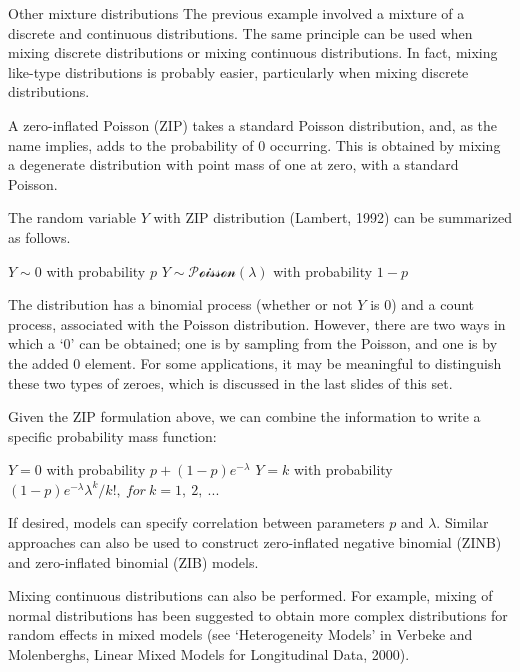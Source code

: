 \documentclass[
  9pt,
  ignorenonframetext,
]{beamer}
\begin{document}
\begin{frame}{Other mixture distributions}
\protect\hypertarget{other-mixture-distributions}{}
The previous example involved a mixture of a discrete and continuous
distributions. The same principle can be used when mixing discrete
distributions or mixing continuous distributions. In fact, mixing
like-type distributions is probably easier, particularly when mixing
discrete distributions.

A zero-inflated Poisson (ZIP) takes a standard Poisson distribution,
and, as the name implies, adds to the probability of 0 occurring. This
is obtained by mixing a degenerate distribution with point mass of one
at zero, with a standard Poisson.

The random variable \(Y\) with ZIP distribution (Lambert, 1992) can be
summarized as follows.

\(Y \sim 0\) with probability \(p\)
\(Y \sim \mathcal {Poisson}(\lambda)\) with probability \(1-p\)
\end{frame}

\begin{frame}{}
\protect\hypertarget{section-13}{}
The distribution has a binomial process (whether or not \(Y\) is 0) and
a count process, associated with the Poisson distribution. However,
there are two ways in which a `0' can be obtained; one is by sampling
from the Poisson, and one is by the added 0 element. For some
applications, it may be meaningful to distinguish these two types of
zeroes, which is discussed in the last slides of this set.

Given the ZIP formulation above, we can combine the information to write
a specific probability mass function:

\(Y=0\) with probability \(p+(1-p)e^{-\lambda}\) \(Y=k\) with
probability \((1-p) e^{-\lambda}\lambda^k/k!,\ for\ k=1,\ 2,\ ...\)
\end{frame}

\begin{frame}{}
\protect\hypertarget{section-14}{}
If desired, models can specify correlation between parameters \(p\) and
\(\lambda\). Similar approaches can also be used to construct
zero-inflated negative binomial (ZINB) and zero-inflated binomial (ZIB)
models.

Mixing continuous distributions can also be performed. For example,
mixing of normal distributions has been suggested to obtain more complex
distributions for random effects in mixed models (see `Heterogeneity
Models' in Verbeke and Molenberghs, Linear Mixed Models for Longitudinal
Data, 2000).
\end{frame}
\end{document}

